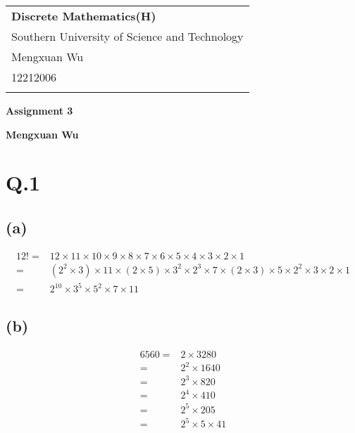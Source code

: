 \documentclass[a4paper,12pt]{article}
\begin{document}
\thispagestyle{empty} %

\begin{tabular}{p{15.5cm}}
{\large \bf Discrete Mathematics(H)} \\
Southern University of Science and Technology \\ Mengxuan Wu \\ 12212006 \\
\hline
\\
\end{tabular}

\vspace*{0.3cm} %

\begin{center}
	{\Large \bf Assignment 3}
	\vspace{2mm}

	{\bf Mengxuan Wu}
		
\end{center}  

\vspace{0.4cm}

\section*{Q.1}

\subsection*{(a)}

\begin{align*}
	12! =& 12 \times 11 \times 10 \times 9 \times 8 \times 7 \times 6 \times 5 \times 4 \times 3 \times 2 \times 1 \\
	=& (2^2 \times 3) \times 11 \times (2 \times 5) \times 3^2 \times 2^3 \times 7 \times (2 \times 3) \times 5 \times 2^2 \times 3 \times 2 \times 1 \\ 
	=& 2^{10} \times 3^5 \times 5^2 \times 7 \times 11
\end{align*}

\subsection*{(b)}

\begin{align*}
	6560 =& 2 \times 3280 \\
	=& 2^2 \times 1640 \\
	=& 2^3 \times 820 \\
	=& 2^4 \times 410 \\
	=& 2^5 \times 205 \\
	=& 2^5 \times 5 \times 41 
\end{align*}
\end{document}

